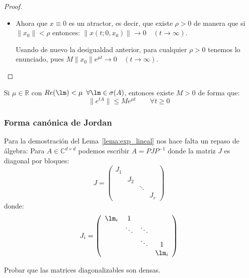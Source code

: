 \begin{teo}
\begin{proof}
\begin{itemize}
                En vista de la acotación superir, para $\delta = \frac{\varepsilon}{M}$ lo tenemos.
            \item Ahora que $x\equiv 0$ es un atractor, es decir, que existe $\rho>0$ de manera que si $\|x_0\|<\rho$ entonces: $\|x(t;0,x_0)\| \to 0 \quad (t\to \infty)$.

                Usando de nuevo la desigualdad anterior, para cualquier $\rho>0$ tenemos lo enunciado, pues $M\|x_0\|e^{\mu t}\to 0\quad (t\to\infty)$.
        \end{itemize}
    \end{proof}
\end{teo}

\begin{lema}\label{lema:exp_lineal}
    Si $\mu\in \mathbb{R}$ con $Re(\lm)<\mu$ $\forall \lm\in \sigma(A)$, entonces existe $M>0$ de forma que:
    \begin{equation*}
        \|e^{tA}\| \leq Me^{\mu t} \qquad \forall t\geq 0
    \end{equation*}
\end{lema}


\subsubsection{Forma canónica de Jordan}
\noindent
Para la demostración del Lema~\ref{lema:exp_lineal} nos hace falta un repaso de álgebra:
Para $A\in \mathbb{C}^{d\times d}$ podemos escribir $A = PJP^{-1}$ donde la matriz $J$ es diagonal por bloques:
\begin{equation*}
    J = \left(\begin{array}{cccc}
        J_1 &  &  &  \\
         & J_2 &  &  \\
         &  & \ddots &  \\
         &  &  &  J_r
    \end{array}\right)
\end{equation*}
donde:
\begin{equation*}
    J_i = \left(\begin{array}{cccc}
        \lm_i & 1 &  &  \\
         & \ddots & \ddots &  \\
         &  & \ddots & 1 \\
         &  &  &  \lm_i
    \end{array}\right)
\end{equation*}

\begin{ejercicio}
    Probar que las matrices diagonalizables son densas.
\end{ejercicio}

